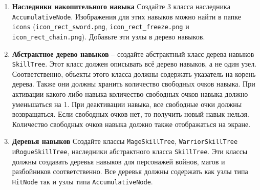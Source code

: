 \documentclass{article}
\begin{document}
\begin{enumerate}
\item \textbf{Наследники накопительного навыка} Создайте 3 класса наследника \texttt{AccumulativeNode}. Изображения для этих навыков можно найти в папке \texttt{icons} (\texttt{icon\_rect\_sword.png}, \texttt{icon\_rect\_freeze.png} и\\ \texttt{icon\_rect\_chain.png}). Добавьте эти узлы в дерево навыков.


\item \textbf{Абстрактное дерево навыков} -- создайте абстрактный класс дерева навыков \texttt{SkillTree}. Этот класс должен описывать всё дерево навыков, а не один узел. Соответственно, объекты этого класса должны содержать указатель на корень дерева. Также они должны хранить количество свободных очков навыка. При активации какого-либо навыка количество свободных очков навыка должно уменьшаться на 1. При деактивации навыка, все свободные очки должны возвращаться. Если свободных очков нет, то получить новый навык нельзя. Количество свободных очков навыка должно также отображаться на экране.

\item \textbf{Деревья навыков} Создайте классы \texttt{MageSkillTree}, \texttt{WarriorSkillTree} и\texttt{RogueSkillTree}, наследники абстрактного класса \texttt{SkillTree}. Эти классы должны создавать деревья навыков для персонажей войнов, магов и разбойников соответственно. Все деревья должны содержать как узлы типа \texttt{HitNode} так и узлы типа \texttt{AccumulativeNode}.

\end{enumerate}
\end{document}
